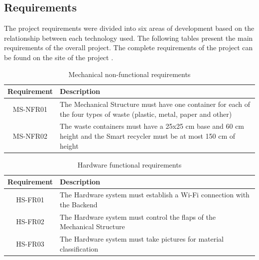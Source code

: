 \documentclass[a4paper,11pt]{article}
\begin{document}
\subsection{Requirements}
\label{subsec:requirement}

The project requirements were divided into six areas of development based on the relationship between each technology used. The following tables present the main requirements of the overall project. The complete requirements of the project can be found on the site of the project \cite{blog}.

\begin{table}[H]
  \caption{\small{Mechanical non-functional requirements}}
  \begin{center}
    \begin{tabular}{|c|p{95mm}|}
      \hline
      Requirement & Description                                                                                                             \\ \hline
      MS-NFR01    & The Mechanical Structure must have one container for each of the four types of waste (plastic, metal, paper and other)  \\ \hline
      MS-NFR02    & The waste containers must have a 25x25 cm base and 60 cm height and the Smart recycler must be at most 150 cm of height \\ \hline
    \end{tabular}
  \end{center}
  \label{tab:mechanical1}
\end{table}

\begin{table}[H]
  \caption{\small{Hardware functional requirements}}
  \begin{center}
    \begin{tabular}{|c|p{95mm}|}
      \hline
      Requirement & Description                                                            \\ \hline
      HS-FR01     & The Hardware system must establish a Wi-Fi connection with the Backend \\ \hline
      HS-FR02     & The Hardware system must control the flaps of the Mechanical Structure \\ \hline
      HS-FR03     & The Hardware system must take pictures for material classification     \\ \hline
    \end{tabular}
  \end{center}
  \label{tab:hardware0}
\end{table}
\end{document}
